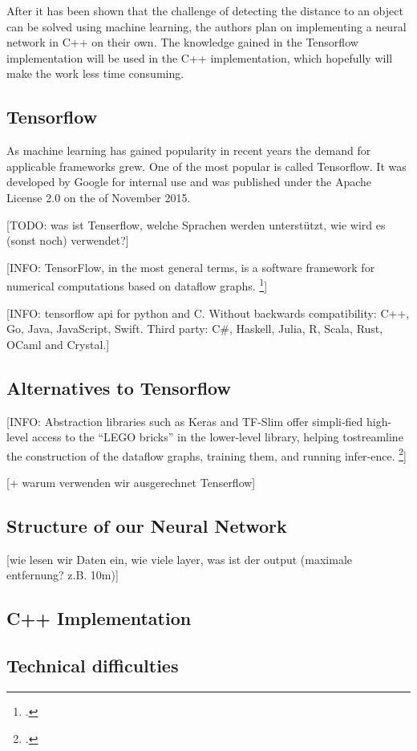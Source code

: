 After it has been shown that the challenge of detecting the distance to an object can be solved using machine learning, the authors plan on implementing a neural network in C++ on their own. The knowledge gained in the Tensorflow implementation will be used in the C++ implementation, which hopefully will make the work less time consuming.

\subsection{Tensorflow}
As machine learning has gained popularity in recent years the demand for applicable frameworks grew. One of the most popular is called Tensorflow. It was developed by Google for internal use and was published under the Apache License 2.0 on the  of November 2015.

[TODO: was ist Tenserflow, welche Sprachen werden unterstützt, wie wird es (sonst noch) verwendet?]

[INFO: TensorFlow,  in  the  most  general  terms,  is  a  software  framework  for  numerical  computations based on dataflow graphs. \footcite[page 6]{Hope_Learning_TensorFlow}]

[INFO: tensorflow api for python and C. Without backwards compatibility: C++, Go, Java, JavaScript, Swift. Third party: C\#, Haskell, Julia, R, Scala, Rust, OCaml and Crystal.]

\subsection{Alternatives to Tensorflow}

[INFO: Abstraction libraries such as Keras and TF-Slim offer simpli‐fied  high-level  access  to  the  “LEGO  bricks”  in  the  lower-level  library,  helping  tostreamline the construction of the dataflow graphs, training them, and running infer‐ence. \footcite[page 7]{Hope_Learning_TensorFlow}]

[+ warum verwenden wir ausgerechnet Tenserflow]

\subsection{Structure of our Neural Network}

[wie lesen wir Daten ein, wie viele layer, was ist der output (maximale entfernung? z.B. 10m)]

\subsection{C++ Implementation}

\subsection{Technical difficulties}

\filbreak